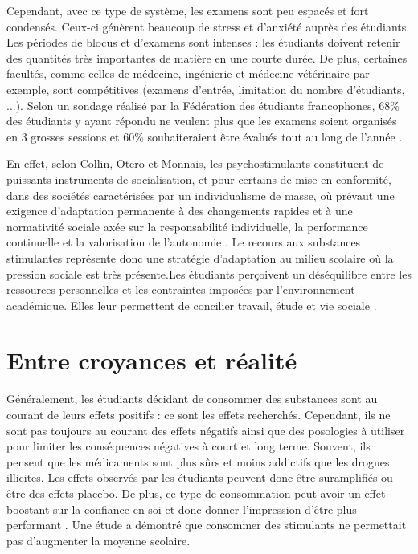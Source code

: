 Cependant, avec ce type de système, les examens sont peu espacés et fort condensés.
Ceux-ci génèrent beaucoup de stress et d'anxiété auprès des étudiants. Les périodes de blocus et d'examens sont intenses : les étudiants doivent retenir des quantités très importantes de matière en une courte durée. De plus, certaines facultés, comme celles de médecine, ingénierie et médecine vétérinaire par exemple, sont compétitives (examens d'entrée, limitation du nombre d'étudiants, ...). Selon un sondage réalisé par la Fédération des étudiants francophones, 68\% des étudiants y ayant répondu ne veulent plus que les examens soient organisés en 3 grosses sessions et 60\% souhaiteraient être évalués tout au long de l'année \parencite{baus_stop_2022}.

En effet, selon Collin, Otero et Monnais, les psychostimulants constituent \guillemotleft de puissants instruments de socialisation, et pour certains de mise en conformité, dans des sociétés caractérisées par un individualisme de masse, où prévaut une exigence d'adaptation permanente à des changements rapides et à une normativité sociale axée sur la responsabilité individuelle, la performance continuelle et la valorisation de l'autonomie \guillemotright \parencite{gagnon_johanne_2008}. 
Le recours aux substances stimulantes représente donc une stratégie d'adaptation au milieu scolaire où la pression sociale est très présente.Les étudiants perçoivent un déséquilibre entre les ressources personnelles et les contraintes imposées par l'environnement académique. Elles leur permettent de concilier travail, étude et vie sociale \parencite{thoer_utiliser_2013}.

\section{Entre croyances et réalité}

Généralement, les étudiants décidant de consommer des substances sont au courant de leurs effets positifs : ce sont les effets recherchés. Cependant, ils ne sont pas toujours au courant des effets négatifs ainsi que des posologies à utiliser pour limiter les conséquences négatives à court et long terme. Souvent, ils pensent que les médicaments sont plus sûrs et moins addictifs que les drogues illicites. Les effets observés par les étudiants peuvent donc être suramplifiés ou être des effets placebo. De plus, ce type de consommation peut avoir un effet boostant sur la confiance en soi et donc donner l'impression d'être plus performant \parencite{c_guillain_les_2021}.
Une étude a démontré que consommer des stimulants ne permettait pas d'augmenter la moyenne scolaire. \newline

